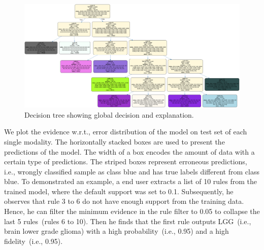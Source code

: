 \begin{figure}
	\centering
		\includegraphics[scale=0.22]{images/simple_tree_pre.png}
	    \caption{Decision tree showing global decision and explanation.}
	    \label{fig:skater_global}
\end{figure}

\hspace*{3.5mm} We plot the evidence w.r.t., error distribution of the model on  test set of each single modality. The horizontally stacked boxes are used to present the predictions of the model. The width of a box encodes the amount of data with a certain type of predictions. The striped boxes represent erroneous predictions, i.e., wrongly classified  sample as class blue and has true labels different from class blue. To demonstrated an example, a end user extracts a list of 10 rules from the trained model, where the default support was set to 0.1. Subsequently, he observes that rule 3 to 6 do not have enough support from the training data. Hence, he can filter the minimum evidence in the rule filter to 0.05 to collapse the last 5 rules~(rules 6 to 10). Then he finds that the first rule outputs LGG~(i.e., brain lower grade glioma) with a high probability~(i.e., 0.95) and a high fidelity~(i.e., 0.95). 

